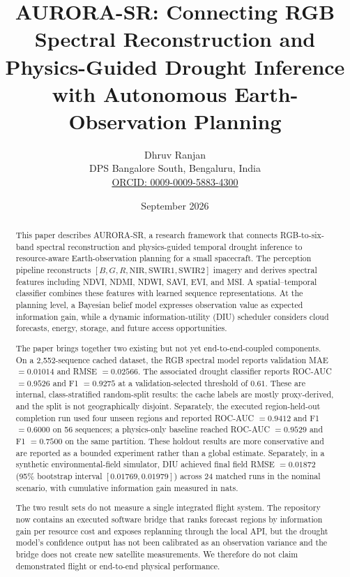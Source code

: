 \documentclass[11pt,a4paper]{article}
\title{
\textbf{
AURORA-SR: Connecting RGB Spectral Reconstruction and
Physics-Guided Drought Inference with Autonomous
Earth-Observation Planning
}
}
\author{
Dhruv Ranjan\\
DPS Bangalore South, Bengaluru, India\\
\href{https://orcid.org/0009-0009-5883-4300}{ORCID: 0009-0009-5883-4300}
}
\date{September 2026}
\newcommand{\NIR}{\mathrm{NIR}}
\newcommand{\SWIRone}{\mathrm{SWIR1}}
\newcommand{\SWIRtwo}{\mathrm{SWIR2}}
\begin{document}
\maketitle


\begin{abstract}

This paper describes AURORA-SR, a research framework that connects
RGB-to-six-band spectral reconstruction and physics-guided temporal
drought inference to resource-aware Earth-observation planning for a
small spacecraft. The perception pipeline reconstructs
$[B,G,R,\NIR,\SWIRone,\SWIRtwo]$ imagery and derives spectral features
including NDVI, NDMI, NDWI, SAVI, EVI, and MSI. A spatial--temporal
classifier combines these features with learned sequence
representations. At the planning level, a Bayesian belief model
expresses observation value as expected information gain, while a
dynamic information-utility (DIU) scheduler considers cloud forecasts,
energy, storage, and future access opportunities.

The paper brings together two existing but not yet end-to-end-coupled
components. On a 2,552-sequence cached dataset, the RGB spectral model
reports validation MAE $=0.01014$ and RMSE $=0.02566$. The associated
drought classifier reports ROC-AUC $=0.9526$ and F1 $=0.9275$ at a
validation-selected threshold of $0.61$. These are internal,
class-stratified random-split results: the cache labels are mostly
proxy-derived, and the split is not geographically disjoint. Separately,
the executed region-held-out completion run used four unseen regions and
reported ROC-AUC $=0.9412$ and F1 $=0.6000$ on 56 sequences; a
physics-only baseline reached ROC-AUC $=0.9529$ and F1 $=0.7500$ on the
same partition. These holdout results are more conservative and are
reported as a bounded experiment rather than a global estimate.
Separately,
in a synthetic environmental-field simulator, DIU achieved final field
RMSE $=0.01872$ (95\% bootstrap interval $[0.01769,0.01979]$) across
24 matched runs in the nominal scenario, with cumulative information
gain measured in nats.

The two result sets do not measure a single integrated flight system. The
repository now contains an executed software bridge that ranks forecast
regions by information gain per resource cost and exposes replanning
through the local API, but the drought model's confidence output has not
been calibrated as an observation variance and the bridge does not create
new satellite measurements. We therefore do not claim demonstrated
flight or end-to-end physical performance.

\end{abstract}
\end{document}
